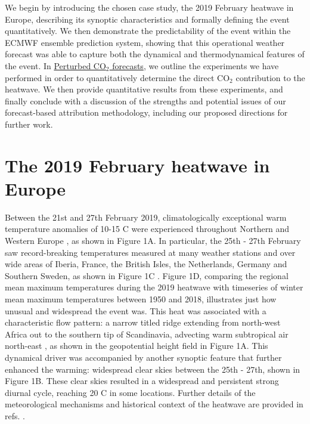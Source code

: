   We begin by introducing the chosen case study, the 2019 February heatwave in Europe, describing its synoptic characteristics and formally defining the event quantitatively. We then demonstrate the predictability of the event within the ECMWF ensemble prediction system, showing that this operational weather forecast was able to capture both the dynamical and thermodynamical features of the event. In \hyperref[Ch4:experiments]{Perturbed CO$_2$ forecasts}, we outline the experiments we have performed in order to quantitatively determine the direct CO$_2$ contribution to the heatwave. We then provide quantitative results from these experiments, and finally conclude with a discussion of the strengths and potential issues of our forecast-based attribution methodology, including our proposed directions for further work.

\section{The 2019 February heatwave in Europe}\label{Ch4:heatwave}

  Between the 21st and 27th February 2019, climatologically exceptional warm temperature anomalies of 10-15 \degree C were experienced throughout Northern and Western Europe \citep{young_record-breaking_2020}, as shown in Figure 1A. In particular, the 25th - 27th February saw record-breaking temperatures measured at many weather stations and over wide areas of Iberia, France, the British Isles, the Netherlands, Germany and Southern Sweden, as shown in Figure 1C \citep{cornes_ensemble_2018}. Figure 1D, comparing the regional mean maximum temperatures during the 2019 heatwave with timeseries of winter mean maximum temperatures between 1950 and 2018, illustrates just how unusual and widespread the event was. This heat was associated with a characteristic flow pattern: a narrow titled ridge extending from north-west Africa out to the southern tip of Scandinavia, advecting warm subtropical air north-east \citep{sousa_european_2018}, as shown in the geopotential height field in Figure 1A. This dynamical driver was accompanied by another synoptic feature that further enhanced the warming: widespread clear skies between the 25th - 27th, shown in Figure 1B. These clear skies resulted in a widespread and persistent strong diurnal cycle, reaching 20 \degree C in some locations. Further details of the meteorological mechanisms and historical context of the heatwave are provided in refs. \citep{young_record-breaking_2020,kendon_temperature_2020,christidis_extremely_2021}.
  
